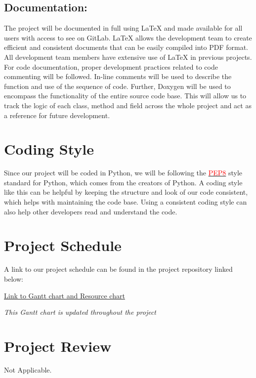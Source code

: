 \documentclass{article}
\begin{document}
\subsection*{Documentation:}

The project will be documented in full using LaTeX and made available for all
users with access to see on GitLab. LaTeX allows the development team to create
efficient and consistent documents that can be easily compiled into PDF format.
All development team members have extensive use of LaTeX in previous projects.
For code documentation, proper development practices related to code commenting
will be followed. In-line comments will be used to describe the function and use
of the sequence of code. Further, Doxygen will be used to encompass the
functionality of the entire source code base. This will allow us to track the
logic of each class, method and field across the whole project and act as a
reference for future development.

\section{Coding Style}

Since our project will be coded in Python, we will be following the
\href{https://www.python.org/dev/peps/pep-0008/}{\textcolor{red}{PEP8}} style standard for
Python, which comes from the creators of Python. A coding style like this can be
helpful by keeping the structure and look of our code consistent, which helps
with maintaining the code base. Using a consistent coding style can also help
other developers read and understand the code.

\section{Project Schedule}
A link to our project schedule can be found in the project repository linked below:

\href{https://gitlab.cas.mcmaster.ca/jandricd/super-refactored-mario-bros/tree/master/ProjectSchedule}{Link to Gantt chart and Resource chart}

{\it This Gantt chart is updated throughout the project}


\section{Project Review}
Not Applicable.
\end{document}
